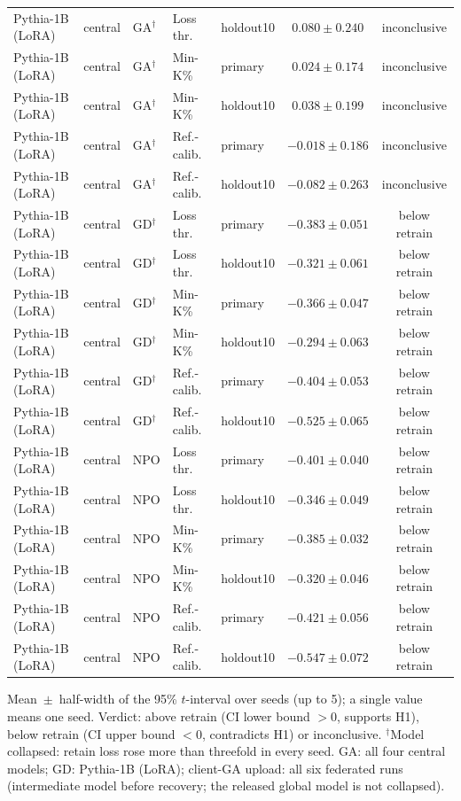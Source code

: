 {\begin{longtable}{@{\extracolsep{\fill}}lllllcc@{}}
Pythia-1B (LoRA) & central & GA$^{\dagger}$ & Loss thr. & holdout10 & $0.080 \pm 0.240$ & inconclusive \\
Pythia-1B (LoRA) & central & GA$^{\dagger}$ & Min-K\% & primary & $0.024 \pm 0.174$ & inconclusive \\
Pythia-1B (LoRA) & central & GA$^{\dagger}$ & Min-K\% & holdout10 & $0.038 \pm 0.199$ & inconclusive \\
Pythia-1B (LoRA) & central & GA$^{\dagger}$ & Ref.-calib. & primary & $-0.018 \pm 0.186$ & inconclusive \\
Pythia-1B (LoRA) & central & GA$^{\dagger}$ & Ref.-calib. & holdout10 & $-0.082 \pm 0.263$ & inconclusive \\
Pythia-1B (LoRA) & central & GD$^{\dagger}$ & Loss thr. & primary & $-0.383 \pm 0.051$ & below retrain \\
Pythia-1B (LoRA) & central & GD$^{\dagger}$ & Loss thr. & holdout10 & $-0.321 \pm 0.061$ & below retrain \\
Pythia-1B (LoRA) & central & GD$^{\dagger}$ & Min-K\% & primary & $-0.366 \pm 0.047$ & below retrain \\
Pythia-1B (LoRA) & central & GD$^{\dagger}$ & Min-K\% & holdout10 & $-0.294 \pm 0.063$ & below retrain \\
Pythia-1B (LoRA) & central & GD$^{\dagger}$ & Ref.-calib. & primary & $-0.404 \pm 0.053$ & below retrain \\
Pythia-1B (LoRA) & central & GD$^{\dagger}$ & Ref.-calib. & holdout10 & $-0.525 \pm 0.065$ & below retrain \\
Pythia-1B (LoRA) & central & NPO & Loss thr. & primary & $-0.401 \pm 0.040$ & below retrain \\
Pythia-1B (LoRA) & central & NPO & Loss thr. & holdout10 & $-0.346 \pm 0.049$ & below retrain \\
Pythia-1B (LoRA) & central & NPO & Min-K\% & primary & $-0.385 \pm 0.032$ & below retrain \\
Pythia-1B (LoRA) & central & NPO & Min-K\% & holdout10 & $-0.320 \pm 0.046$ & below retrain \\
Pythia-1B (LoRA) & central & NPO & Ref.-calib. & primary & $-0.421 \pm 0.056$ & below retrain \\
Pythia-1B (LoRA) & central & NPO & Ref.-calib. & holdout10 & $-0.547 \pm 0.072$ & below retrain \\
\end{longtable}
Mean~$\pm$~half-width of the 95\% $t$-interval over seeds (up to 5); a single value means one seed. Verdict: above retrain (CI lower bound $>0$, supports H1), below retrain (CI upper bound $<0$, contradicts H1) or inconclusive. $^{\dagger}$Model collapsed: retain loss rose more than threefold in every seed. GA: all four central models; GD: Pythia-1B (LoRA); client-GA upload: all six federated runs (intermediate model before recovery; the released global model is not collapsed).\par
}
